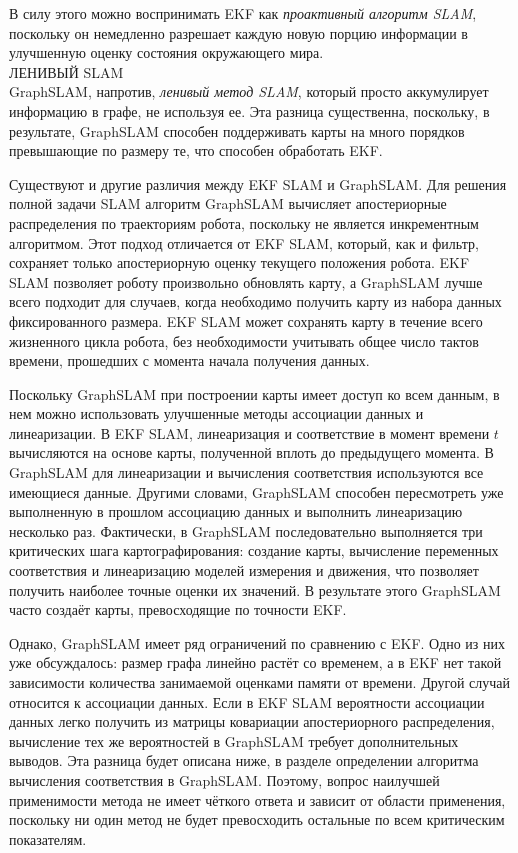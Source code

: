 \documentclass[10pt,a4paper]{article}
\begin{document}
В силу этого можно воспринимать EKF как \textit{проактивный алгоритм SLAM}, поскольку он немедленно разрешает каждую новую порцию информации в улучшенную оценку состояния окружающего мира.\\

ЛЕНИВЫЙ SLAM\\

GraphSLAM, напротив, \textit{ленивый метод SLAM}, который просто аккумулирует информацию в графе, не используя ее. Эта разница существенна, поскольку, в результате, GraphSLAM способен поддерживать карты на много порядков превышающие по размеру те, что способен обработать EKF.

Существуют и другие различия между EKF SLAM и GraphSLAM. Для решения полной задачи SLAM алгоритм GraphSLAM вычисляет апостериорные распределения по траекториям робота, поскольку не является инкрементным алгоритмом. Этот подход отличается от EKF SLAM, который, как и фильтр, сохраняет только апостериорную оценку текущего положения робота. EKF SLAM позволяет роботу произвольно обновлять карту, а GraphSLAM лучше всего подходит для случаев, когда необходимо получить карту из набора данных фиксированного размера. EKF SLAM может сохранять карту в течение всего жизненного цикла робота, без необходимости учитывать общее число тактов времени, прошедших с момента начала получения данных.

Поскольку GraphSLAM при построении карты имеет доступ ко всем данным, в нем можно использовать улучшенные методы ассоциации данных и линеаризации. В EKF SLAM, линеаризация и соответствие в момент времени $t$ вычисляются на основе карты, полученной вплоть до предыдущего момента. В GraphSLAM для линеаризации и вычисления соответствия используются все имеющиеся данные. Другими словами, GraphSLAM способен пересмотреть уже выполненную в прошлом ассоциацию данных и выполнить линеаризацию несколько раз. Фактически, в GraphSLAM последовательно выполняется три критических шага картографирования: создание карты, вычисление переменных соответствия и линеаризацию моделей измерения и движения, что позволяет получить наиболее точные оценки их значений. В результате этого GraphSLAM часто создаёт карты, превосходящие по точности EKF.

Однако, GraphSLAM имеет ряд ограничений по сравнению с EKF. Одно из них уже обсуждалось: размер графа линейно растёт со временем, а в EKF нет такой зависимости количества занимаемой оценками памяти от времени. Другой случай относится к ассоциации данных. Если в EKF SLAM вероятности ассоциации данных легко получить из матрицы ковариации апостериорного распределения, вычисление тех же вероятностей в GraphSLAM требует дополнительных выводов. Эта разница будет описана ниже, в разделе определении алгоритма вычисления соответствия в GraphSLAM. Поэтому, вопрос наилучшей применимости метода не имеет чёткого ответа и зависит от области применения, поскольку ни один метод не будет превосходить остальные по всем критическим показателям. 
\end{document}

